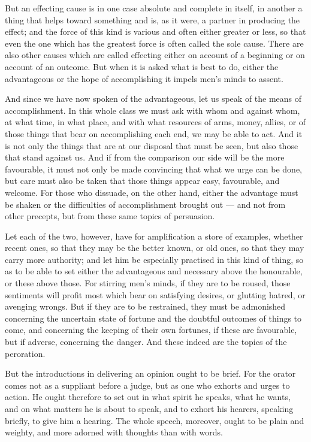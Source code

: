  But an effecting cause is in one case absolute and complete in itself, in another a thing that helps toward something and is, as it were, a partner in producing the effect; and the force of this kind is various and often either greater or less, so that even the one which has the greatest force is often called the sole cause. There are also other causes which are called effecting either on account of a beginning or on account of an outcome. But when it is asked what is best to do, either the advantageous or the hope of accomplishing it impels men's minds to assent.

 And since we have now spoken of the advantageous, let us speak of the means of accomplishment. In this whole class we must ask with whom and against whom, at what time, in what place, and with what resources of arms, money, allies, or of those things that bear on accomplishing each end, we may be able to act. And it is not only the things that are at our disposal that must be seen, but also those that stand against us. And if from the comparison our side will be the more favourable, it must not only be made convincing that what we urge can be done, but care must also be taken that those things appear easy, favourable, and welcome. For those who dissuade, on the other hand, either the advantage must be shaken or the difficulties of accomplishment brought out — and not from other precepts, but from these same topics of persuasion.

 Let each of the two, however, have for amplification a store of examples, whether recent ones, so that they may be the better known, or old ones, so that they may carry more authority; and let him be especially practised in this kind of thing, so as to be able to set either the advantageous and necessary above the honourable, or these above those. For stirring men's minds, if they are to be roused, those sentiments will profit most which bear on satisfying desires, or glutting hatred, or avenging wrongs. But if they are to be restrained, they must be admonished concerning the uncertain state of fortune and the doubtful outcomes of things to come, and concerning the keeping of their own fortunes, if these are favourable, but if adverse, concerning the danger. And these indeed are the topics of the peroration.

 But the introductions in delivering an opinion ought to be brief. For the orator comes not as a suppliant before a judge, but as one who exhorts and urges to action. He ought therefore to set out in what spirit he speaks, what he wants, and on what matters he is about to speak, and to exhort his hearers, speaking briefly, to give him a hearing. The whole speech, moreover, ought to be plain and weighty, and more adorned with thoughts than with words.

